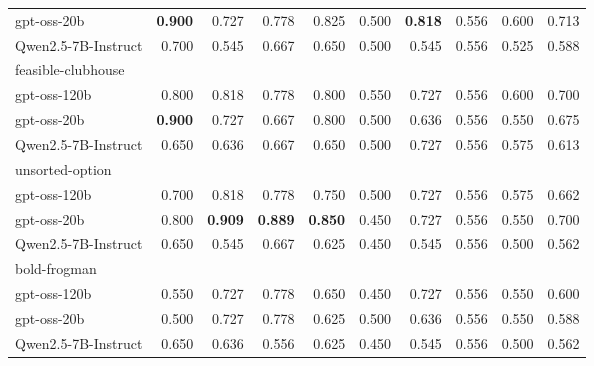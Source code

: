 {\begin{longtable}{@{\extracolsep{\fill}}lrrrrrrrrr@{}}
\quad gpt-oss-20b & \textbf{0.900} & 0.727 & 0.778 & 0.825 & 0.500 & \textbf{0.818} & 0.556 & 0.600 & 0.713 \\
\quad Qwen2.5-7B-Instruct & 0.700 & 0.545 & 0.667 & 0.650 & 0.500 & 0.545 & 0.556 & 0.525 & 0.588 \\
\midrule
\multicolumn{10}{l}{feasible-clubhouse} \\*
\quad gpt-oss-120b & 0.800 & 0.818 & 0.778 & 0.800 & 0.550 & 0.727 & 0.556 & 0.600 & 0.700 \\
\quad gpt-oss-20b & \textbf{0.900} & 0.727 & 0.667 & 0.800 & 0.500 & 0.636 & 0.556 & 0.550 & 0.675 \\
\quad Qwen2.5-7B-Instruct & 0.650 & 0.636 & 0.667 & 0.650 & 0.500 & 0.727 & 0.556 & 0.575 & 0.613 \\
\midrule
\multicolumn{10}{l}{unsorted-option} \\*
\quad gpt-oss-120b & 0.700 & 0.818 & 0.778 & 0.750 & 0.500 & 0.727 & 0.556 & 0.575 & 0.662 \\
\quad gpt-oss-20b & 0.800 & \textbf{0.909} & \textbf{0.889} & \textbf{0.850} & 0.450 & 0.727 & 0.556 & 0.550 & 0.700 \\
\quad Qwen2.5-7B-Instruct & 0.650 & 0.545 & 0.667 & 0.625 & 0.450 & 0.545 & 0.556 & 0.500 & 0.562 \\
\midrule
\multicolumn{10}{l}{bold-frogman} \\*
\quad gpt-oss-120b & 0.550 & 0.727 & 0.778 & 0.650 & 0.450 & 0.727 & 0.556 & 0.550 & 0.600 \\
\quad gpt-oss-20b & 0.500 & 0.727 & 0.778 & 0.625 & 0.500 & 0.636 & 0.556 & 0.550 & 0.588 \\
\quad Qwen2.5-7B-Instruct & 0.650 & 0.636 & 0.556 & 0.625 & 0.450 & 0.545 & 0.556 & 0.500 & 0.562 \\
\end{longtable}
}
